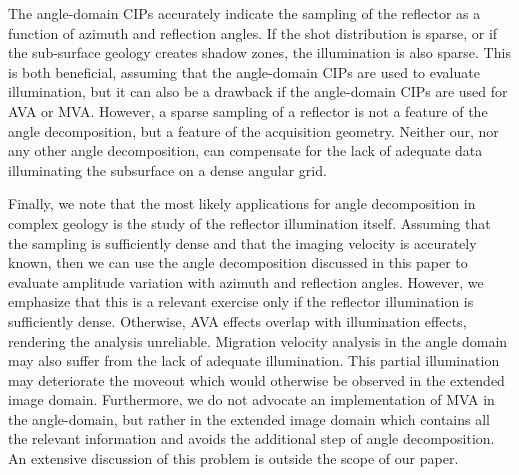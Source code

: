 The angle-domain CIPs accurately indicate the sampling of the
reflector as a function of azimuth and reflection angles. If the shot
distribution is sparse, or if the sub-surface geology creates shadow
zones, the illumination is also sparse. This is both beneficial,
assuming that the angle-domain CIPs are used to evaluate illumination,
but it can also be a drawback if the angle-domain CIPs are used
for AVA or MVA. However, a sparse sampling of a reflector is not a
feature of the angle decomposition, but a feature of the acquisition
geometry. Neither our, nor any other angle decomposition, can
compensate for the lack of adequate data illuminating the subsurface
on a dense angular grid.

Finally, we note that the most likely applications for angle
decomposition in complex geology is the study of the reflector
illumination itself. Assuming that the sampling is sufficiently dense
and that the imaging velocity is accurately known, then we can use the
angle decomposition discussed in this paper to evaluate amplitude
variation with azimuth and reflection angles. However, we emphasize
that this is a relevant exercise only if the reflector illumination is
sufficiently dense. Otherwise, AVA effects overlap with illumination
effects, rendering the analysis unreliable.
%
Migration velocity analysis in the angle domain may also suffer from
the lack of adequate illumination. This partial illumination may
deteriorate the moveout which would otherwise be observed in the
extended image domain. Furthermore, we do not advocate an
implementation of MVA in the angle-domain, but rather in the extended
image domain which contains all the relevant information and avoids
the additional step of angle decomposition. An extensive discussion
of this problem is outside the scope of our paper.
